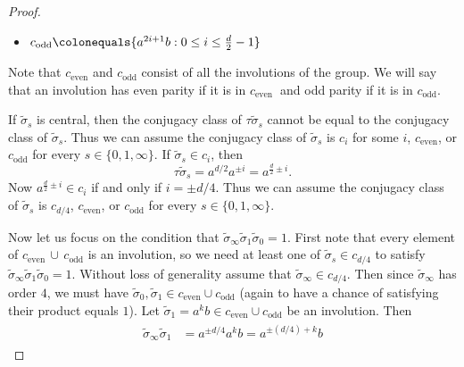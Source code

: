 \documentclass{dcthesis}
\newcommand{\defi}[1]{\textsf{#1}}
\newcommand{\wt}[1]{\widetilde{#1}}
\numberwithin{equation}{section}
\theoremstyle{definition}
\theoremstyle{remark}
\begin{document}
{{{\begin{proof}
\begin{itemize}
          $c_\text{even}
          \colonequals
          \{a^{2i}b : 0\leq i\leq \frac{d}{2}-1\}$
        \item
          $c_\text{odd}
          \colonequals
          \{a^{2i+1}b : 0\leq i\leq \frac{d}{2}-1\}$
      \end{itemize}
      Note that $c_\text{even}$ and $c_\text{odd}$
      consist of all the involutions of the group.
      We will say that an involution has
      \defi{even parity}
      if it is in $c_\text{even }$
      and \defi{odd parity}
      if it is in $c_\text{odd}$.
      \par
      If $\wt{\sigma}_s$ is central,
      then the conjugacy class of
      $\tau\wt{\sigma}_s$ cannot be equal to
      the conjugacy class of
      $\wt{\sigma}_s$.
      Thus we can assume
      the conjugacy class of
      $\wt{\sigma}_s$
      is $c_i$ for some $i$,
      $c_\text{even}$, or
      $c_\text{odd}$ for every $s\in \{0,1,\infty\}$.
      If $\wt{\sigma}_s\in c_i$,
      then
      \begin{equation}
        \label{eqn:alphaci}
        \tau\wt{\sigma}_s
        =a^{d/2}a^{\pm i}=a^{\frac{d}{2}\pm i}.
      \end{equation}
      Now $a^{\frac{d}{2}\pm i}\in c_i$
      if and only if
      $i=\pm d/4$.
      Thus we can assume the conjugacy class of
      $\wt{\sigma}_s$
      is $c_{d/4}$,
      $c_\text{even}$, or
      $c_\text{odd}$
      for every $s\in \{0,1,\infty\}$.
      \par
      Now let us focus on the condition that
      $\wt{\sigma}_\infty\wt{\sigma}_1
      \wt{\sigma}_0=1$.
      First note that
      every element of
      $c_\text{even}\,\cup\,c_\text{odd}$
      is an involution, so we need
      at least one of $\wt{\sigma}_s\in c_{d/4}$
      to satisfy
      $\wt{\sigma}_\infty\wt{\sigma}_1
      \wt{\sigma}_0=1$.
      Without loss of generality
      assume that
      $\wt{\sigma}_\infty\in c_{d/4}$.
      Then since $\wt{\sigma}_\infty$
      has order $4$,
      we must have
      $\wt{\sigma}_0,\wt{\sigma}_1
      \in c_\text{even}\cup c_\text{odd}$
      (again to have a chance of satisfying
      their product equals $1$).
      Let $\wt{\sigma}_1
      = a^kb
      \in c_\text{even}\cup
      c_\text{odd}$ be an involution.
      Then
      \begin{align}
        \label{eqn:sigma1sigmaoo}
        \begin{split}
          \wt{\sigma}_\infty\wt{\sigma}_1
          &= a^{\pm d/4}a^kb
          = a^{\pm (d/4)+k}b

\end{split}
\end{align}
\end{proof}}}}
\end{document}

